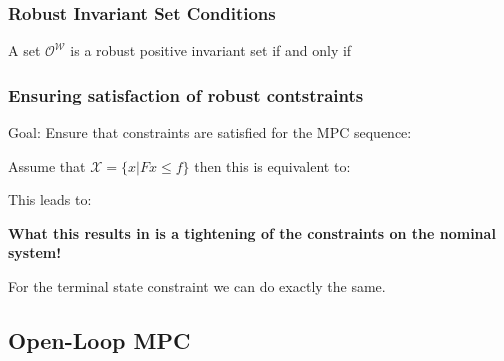 \documentclass[8pt,a4paper]{scrartcl}
\begin{document}
\begin{multicols*}{3}
\begin{multicols*}{4}


\subsubsection{Robust Invariant Set Conditions}

A set $\mathcal{O}^\mathcal{W}$ is a robust positive invariant set if and only if 




\subsubsection{Ensuring satisfaction of robust contstraints}

Goal: Ensure that constraints are satisfied for the MPC sequence:


Assume that $\mathcal{X}=\{x|Fx\leq f\}$ then this is equivalent to:


This leads to:


\textbf{What this results in is a tightening of the constraints on the nominal system!}


For the terminal state constraint we can do exactly the same.

\subsection{Open-Loop MPC}


\end{multicols*}
\end{multicols*}
\end{document}
